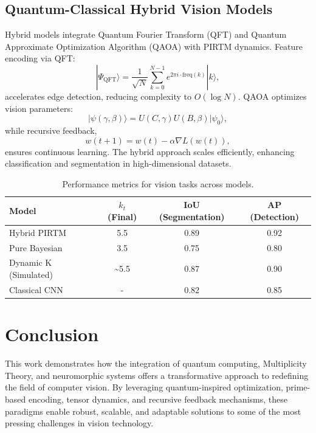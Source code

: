 \documentclass{article}
\theoremstyle{plain}
\begin{document}
\subsection{Quantum-Classical Hybrid Vision Models}
Hybrid models integrate Quantum Fourier Transform (QFT) and Quantum Approximate Optimization Algorithm (QAOA) with PIRTM dynamics. Feature encoding via QFT:
\begin{equation}
    |\Psi_{\text{QFT}}\rangle = \frac{1}{\sqrt{N}} \sum_{k=0}^{N-1} e^{2\pi i \cdot \text{freq}(k)} |k\rangle,
\end{equation}
accelerates edge detection, reducing complexity to \( O(\log N) \). QAOA optimizes vision parameters:
\begin{equation}
    |\psi(\gamma, \beta)\rangle = U(C, \gamma) U(B, \beta) |\psi_0\rangle,
\end{equation}
while recursive feedback,
\begin{equation}
    w(t+1) = w(t) - \alpha \nabla L(w(t)),
\end{equation}
ensures continuous learning. The hybrid approach scales efficiently, enhancing classification and segmentation in high-dimensional datasets.

\begin{table}[h]
    \centering
    \begin{tabular}{|l|c|c|c|}
        \hline
        Model & \( k_t \) (Final) & IoU (Segmentation) & AP (Detection) \\
        \hline
        Hybrid PIRTM & 5.5 & 0.89 & 0.92 \\
        Pure Bayesian & 3.5 & 0.75 & 0.80 \\
        Dynamic K (Simulated) & \sim5.5 & 0.87 & 0.90 \\
        Classical CNN & - & 0.82 & 0.85 \\
        \hline
    \end{tabular}
    \caption{Performance metrics for vision tasks across models.}
    \label{tab:vision_metrics}
\end{table}

\section{Conclusion}

This work demonstrates how the integration of quantum computing, Multiplicity Theory, and neuromorphic systems offers a transformative approach to redefining the field of computer vision. By leveraging quantum-inspired optimization, prime-based encoding, tensor dynamics, and recursive feedback mechanisms, these paradigms enable robust, scalable, and adaptable solutions to some of the most pressing challenges in vision technology.
\end{document}
